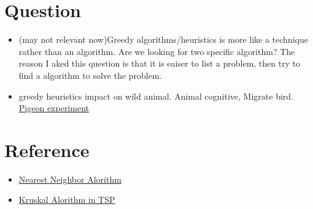 \documentclass[12pt]{article}
\begin{document}
\section{Question}
\begin{itemize}
    \item (may not relevant now)Greedy algorithms/heuristics is more like a technique rather than an algorithm. Are we looking for two 
    specific algorithm? The reason I aked this question is that it is eaiser to list a problem, then try to find a algorithm 
    to solve the problem.
    \item greedy heuristics impact on wild animal. Animal cognitive, Migrate bird. 
    \href{https://www.researchgate.net/publication/263430731_Practice_makes_proficient_pigeons_Columba_livia_learn_efficient_routes_on_full-circuit_navigational_traveling_salesperson_problems}{Pigeon experiment}
\end{itemize}

\section{Reference}
\begin{itemize}
    \item \href{http://math.mit.edu/~goemans/18433S15/TSP-CookCPS.pdf}{Nearest Neighbor Alorithm} 
    \item \href{https://www.ams.org/journals/proc/1956-007-01/S0002-9939-1956-0078686-7/home.html}{Kruskal  Alorithm in TSP} 
\end{itemize}
\end{document}
